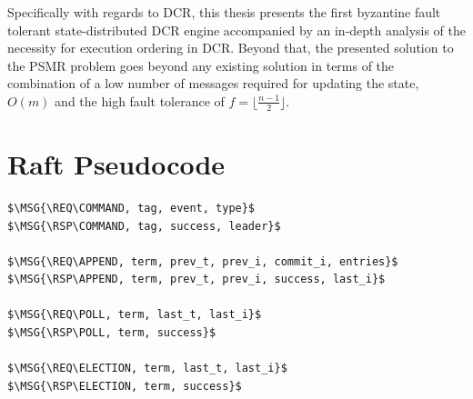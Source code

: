 \documentclass{article}
\begin{document}
	Specifically with regards to DCR, this thesis presents the first byzantine fault tolerant state-distributed DCR engine accompanied by an in-depth analysis of the necessity for execution ordering in DCR.
	Beyond that, the presented solution to the PSMR problem goes beyond any existing solution in terms of the combination of a low number of messages required for updating the state, $O(m)$ and the high fault tolerance of $f = \lfloor\frac{n-1}{2}\rfloor$.

	\newpage
	{}
	

	\newpage

	\appendix
	\section{Raft Pseudocode}
	\begin{mdframed}[backgroundcolor=Papyrus]
	\begin{lstlisting}[style=pseudo, caption={All message types.}]
$\MSG{\REQ\COMMAND, tag, event, type}$
$\MSG{\RSP\COMMAND, tag, success, leader}$

$\MSG{\REQ\APPEND, term, prev_t, prev_i, commit_i, entries}$
$\MSG{\RSP\APPEND, term, prev_t, prev_i, success, last_i}$

$\MSG{\REQ\POLL, term, last_t, last_i}$
$\MSG{\RSP\POLL, term, success}$

$\MSG{\REQ\ELECTION, term, last_t, last_i}$
$\MSG{\RSP\ELECTION, term, success}$
	\end{lstlisting}
	\end{mdframed}
\end{document}
